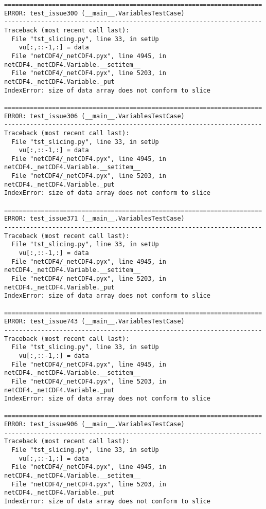 \begin{verbatim}
======================================================================
ERROR: test_issue300 (__main__.VariablesTestCase)
----------------------------------------------------------------------
Traceback (most recent call last):
  File "tst_slicing.py", line 33, in setUp
    vu[:,::-1,:] = data
  File "netCDF4/_netCDF4.pyx", line 4945, in netCDF4._netCDF4.Variable.__setitem__
  File "netCDF4/_netCDF4.pyx", line 5203, in netCDF4._netCDF4.Variable._put
IndexError: size of data array does not conform to slice

======================================================================
ERROR: test_issue306 (__main__.VariablesTestCase)
----------------------------------------------------------------------
Traceback (most recent call last):
  File "tst_slicing.py", line 33, in setUp
    vu[:,::-1,:] = data
  File "netCDF4/_netCDF4.pyx", line 4945, in netCDF4._netCDF4.Variable.__setitem__
  File "netCDF4/_netCDF4.pyx", line 5203, in netCDF4._netCDF4.Variable._put
IndexError: size of data array does not conform to slice

======================================================================
ERROR: test_issue371 (__main__.VariablesTestCase)
----------------------------------------------------------------------
Traceback (most recent call last):
  File "tst_slicing.py", line 33, in setUp
    vu[:,::-1,:] = data
  File "netCDF4/_netCDF4.pyx", line 4945, in netCDF4._netCDF4.Variable.__setitem__
  File "netCDF4/_netCDF4.pyx", line 5203, in netCDF4._netCDF4.Variable._put
IndexError: size of data array does not conform to slice

======================================================================
ERROR: test_issue743 (__main__.VariablesTestCase)
----------------------------------------------------------------------
Traceback (most recent call last):
  File "tst_slicing.py", line 33, in setUp
    vu[:,::-1,:] = data
  File "netCDF4/_netCDF4.pyx", line 4945, in netCDF4._netCDF4.Variable.__setitem__
  File "netCDF4/_netCDF4.pyx", line 5203, in netCDF4._netCDF4.Variable._put
IndexError: size of data array does not conform to slice

======================================================================
ERROR: test_issue906 (__main__.VariablesTestCase)
----------------------------------------------------------------------
Traceback (most recent call last):
  File "tst_slicing.py", line 33, in setUp
    vu[:,::-1,:] = data
  File "netCDF4/_netCDF4.pyx", line 4945, in netCDF4._netCDF4.Variable.__setitem__
  File "netCDF4/_netCDF4.pyx", line 5203, in netCDF4._netCDF4.Variable._put
IndexError: size of data array does not conform to slice


\end{verbatim}

